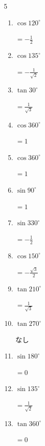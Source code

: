 \begin{multicols}{5}
\begin{enumerate}
  \item $\displaystyle \cos{120^\circ}$

        $\displaystyle =-\frac{1}{2}$

  \item $\displaystyle \cos{135^\circ}$

        $\displaystyle =-\frac{1}{\sqrt{2}}$

  \item $\displaystyle \tan{30^\circ}$

        $\displaystyle =\frac{1}{\sqrt{3}}$

  \item $\displaystyle \cos{360^\circ}$

        $\displaystyle =1$

  \item $\displaystyle \cos{360^\circ}$

        $\displaystyle =1$

\columnbreak %

  \item $\displaystyle \sin{90^\circ}$

        $\displaystyle =1$

  \item $\displaystyle \sin{330^\circ}$

        $\displaystyle =-\frac{1}{2}$

  \item $\displaystyle \cos{150^\circ}$

        $\displaystyle =-\frac{\sqrt{3}}{2}$

  \item $\displaystyle \tan{210^\circ}$

        $\displaystyle =\frac{1}{\sqrt{3}}$

  \item $\displaystyle \tan{270^\circ}$

        $\displaystyle なし$

  \item $\displaystyle \sin{180^\circ}$

        $\displaystyle =0$

  \item $\displaystyle \sin{135^\circ}$

        $\displaystyle =\frac{1}{\sqrt{2}}$

  \item $\displaystyle \tan{360^\circ}$

        $\displaystyle =0$


\end{enumerate}
\end{multicols}

